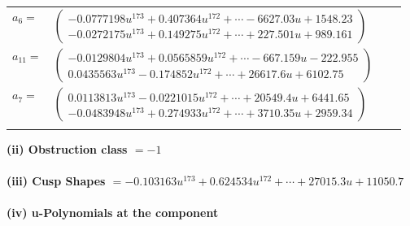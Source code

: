 \documentclass[1p]{elsarticle_modified}
\theoremstyle{definition}
\begin{document}
\begin{tabular}{m{7pt} m{180pt} m{7pt} m{180pt} }
\flushright $a_{6}=$&$\begin{pmatrix}-0.0777198 u^{173}+0.407364 u^{172}+\cdots-6627.03 u+1548.23\\-0.0272175 u^{173}+0.149275 u^{172}+\cdots+227.501 u+989.161\end{pmatrix}$ \\
\flushright $a_{11}=$&$\begin{pmatrix}-0.0129804 u^{173}+0.0565859 u^{172}+\cdots-667.159 u-222.955\\0.0435563 u^{173}-0.174852 u^{172}+\cdots+26617.6 u+6102.75\end{pmatrix}$ \\
\flushright $a_{7}=$&$\begin{pmatrix}0.0113813 u^{173}-0.0221015 u^{172}+\cdots+20549.4 u+6441.65\\-0.0483948 u^{173}+0.274933 u^{172}+\cdots+3710.35 u+2959.34\end{pmatrix}$\\&\end{tabular}
\flushleft \textbf{(ii) Obstruction class $= -1$}\\~\\
\flushleft \textbf{(iii) Cusp Shapes $= -0.103163 u^{173}+0.624534 u^{172}+\cdots+27015.3 u+11050.7$}\\~\\
\newpage\renewcommand{\arraystretch}{1}
\flushleft \textbf{(iv) u-Polynomials at the component}\newline \\
\end{document}
